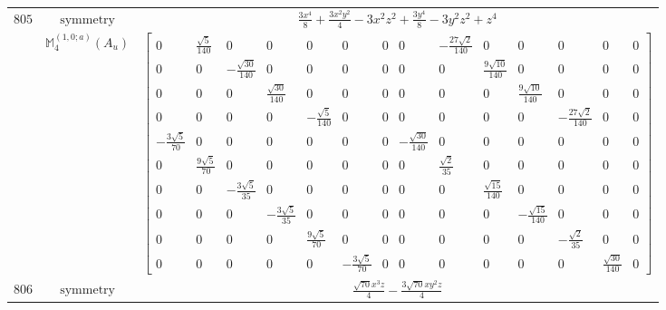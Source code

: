\documentclass[fleqn,8pt,landscape]{jsarticle}
\begin{document}
\begin{longtable}{ccc}
$ 805 $ & $ \text{symmetry} $ & $ \frac{3 x^{4}}{8} + \frac{3 x^{2} y^{2}}{4} - 3 x^{2} z^{2} + \frac{3 y^{4}}{8} - 3 y^{2} z^{2} + z^{4} $ \\
$  $ & $ \mathbb{M}_{4}^{(1,0;a)}(A_{u}) $ & $ \begin{bmatrix} 0 & \frac{\sqrt{5}}{140} & 0 & 0 & 0 & 0 & 0 & 0 & - \frac{27 \sqrt{2}}{140} & 0 & 0 & 0 & 0 & 0 \\ 0 & 0 & - \frac{\sqrt{30}}{140} & 0 & 0 & 0 & 0 & 0 & 0 & \frac{9 \sqrt{10}}{140} & 0 & 0 & 0 & 0 \\ 0 & 0 & 0 & \frac{\sqrt{30}}{140} & 0 & 0 & 0 & 0 & 0 & 0 & \frac{9 \sqrt{10}}{140} & 0 & 0 & 0 \\ 0 & 0 & 0 & 0 & - \frac{\sqrt{5}}{140} & 0 & 0 & 0 & 0 & 0 & 0 & - \frac{27 \sqrt{2}}{140} & 0 & 0 \\ - \frac{3 \sqrt{5}}{70} & 0 & 0 & 0 & 0 & 0 & 0 & - \frac{\sqrt{30}}{140} & 0 & 0 & 0 & 0 & 0 & 0 \\ 0 & \frac{9 \sqrt{5}}{70} & 0 & 0 & 0 & 0 & 0 & 0 & \frac{\sqrt{2}}{35} & 0 & 0 & 0 & 0 & 0 \\ 0 & 0 & - \frac{3 \sqrt{5}}{35} & 0 & 0 & 0 & 0 & 0 & 0 & \frac{\sqrt{15}}{140} & 0 & 0 & 0 & 0 \\ 0 & 0 & 0 & - \frac{3 \sqrt{5}}{35} & 0 & 0 & 0 & 0 & 0 & 0 & - \frac{\sqrt{15}}{140} & 0 & 0 & 0 \\ 0 & 0 & 0 & 0 & \frac{9 \sqrt{5}}{70} & 0 & 0 & 0 & 0 & 0 & 0 & - \frac{\sqrt{2}}{35} & 0 & 0 \\ 0 & 0 & 0 & 0 & 0 & - \frac{3 \sqrt{5}}{70} & 0 & 0 & 0 & 0 & 0 & 0 & \frac{\sqrt{30}}{140} & 0 \end{bmatrix} $ \\ \hline
$ 806 $ & $ \text{symmetry} $ & $ \frac{\sqrt{70} x^{3} z}{4} - \frac{3 \sqrt{70} x y^{2} z}{4} $ \\

\end{longtable}
\end{document}
